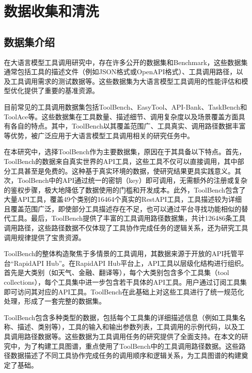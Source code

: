 \section{数据收集和清洗}

\subsection{数据集介绍}

在大语言模型工具调用研究中，存在许多公开的数据集和Benchmark，这些数据集通常包括工具的描述文件（例如JSON格式或OpenAPI格式）、工具调用路径，以及工具调用需求的测试数据等。这些数据集为大语言模型工具调用的性能评估和模型优化提供了重要的基准资源。

目前常见的工具调用数据集包括ToolBench\cite{Qin2023}、EasyTool\cite{yuan2024easytool}、API-Bank\cite{Li2023c}、TaskBench\cite{shen2023taskbench}和ToolAce\cite{liu2024toolace}等。这些数据集在工具数量、描述细节、调用复杂度以及场景覆盖方面具有各自的特点。其中，ToolBench以其覆盖范围广、工具真实、调用路径数据丰富等优势，被广泛应用于大语言模型工具调用相关的研究任务中。

在本研究中，选择ToolBench作为主要数据集，原因在于其具备以下特点。首先，ToolBench的数据来自真实世界的API工具，这些工具不仅可以直接调用，其中部分工具甚至是免费的。这种基于真实环境的数据，使研究结果更具实践意义。其次，ToolBench中的API通过统一的密钥（key）即可调用，无需额外的注册或复杂的鉴权步骤，极大地降低了数据使用的门槛和开发成本。此外，ToolBench包含了大量API工具，覆盖49个类别的16464个真实的RestAPI工具，工具描述较为详细且覆盖范围广泛，即使部分工具描述存在不足，也可以通过平台寻找功能相似的替代工具。最后，ToolBench提供了丰富的工具调用路径数据集，共计126486条工具调用路径，这些路径数据不仅体现了工具协作完成任务的逻辑关系，还为研究工具调用规律提供了宝贵资源。

ToolBench的整体构造聚焦于多情景的工具调用，其数据来源于开放的API托管平台“RapidAPI Hub”。在RapidAPI Hub平台上，API工具以层级化结构进行组织。首先是大类别（如天气、金融、翻译等），每个大类别包含多个工具集（tool collections），每个工具集中进一步包含若干具体的API工具。用户通过订阅工具集即可访问其对应的API工具。ToolBench在此基础上对这些工具进行了统一规范化处理，形成了一套完整的数据集。

ToolBench包含多种类型的数据，包括每个工具集的详细描述信息（例如工具集名称、描述、类别等），工具的输入和输出参数列表，工具调用的示例代码，以及工具调用路径数据等。这些数据为工具调用任务的研究提供了全面支持。在本文的研究中，为了构建工具图谱，重点使用了ToolBench中的工具调用路径数据。这些路径数据描述了不同工具协作完成任务的调用顺序和逻辑关系，为工具图谱的构建奠定了基础。

